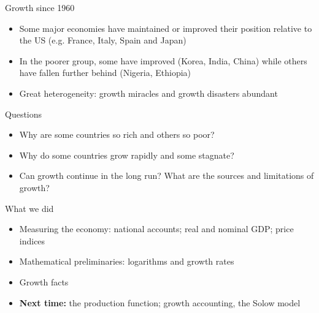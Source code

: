 \documentclass[10pt]{beamer}
\begin{document}
\begin{frame}{Growth since 1960}
\begin{itemize}
    \item Some major economies have maintained or improved their position relative to the US (e.g. France, Italy, Spain and Japan)\medskip

    \item In the poorer group, some have improved (Korea, India, China) while others have fallen further behind (Nigeria, Ethiopia)\medskip

    \item Great heterogeneity: growth miracles and growth disasters abundant
\end{itemize}
\end{frame}




\begin{frame}{Questions}
\begin{itemize}
    \item Why are some countries so rich and others so poor?\medskip

    \item Why do some countries grow rapidly and some stagnate?\medskip

    \item Can growth continue in the long run? What are the sources and limitations of growth?
\end{itemize}
\bigskip
{}
\end{frame}


\begin{frame}{What we did}
\begin{itemize}
    \item Measuring the economy: national accounts; real and nominal GDP; price indices
    \item Mathematical preliminaries: logarithms and growth rates
    \item Growth facts
\bigskip 
\item[] \textbf{Next time:} the production function; growth accounting, the Solow model
\end{itemize}
\end{frame}
\end{document}
